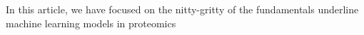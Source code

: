 In this article, we have focused on the nitty-gritty of the fundamentals underline machine learning models in proteomics